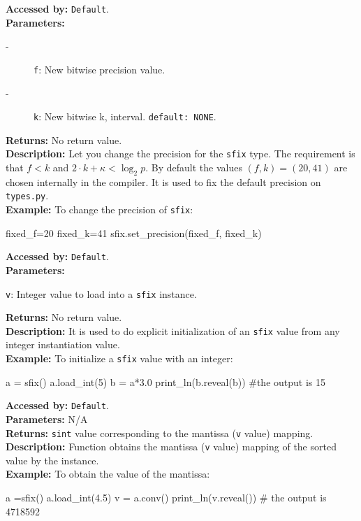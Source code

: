 			\textbf{Accessed by:} \verb|Default|.\\
    		\textbf{Parameters:}
     		\begin{description}
	     		\item[-] \verb|f|: New bitwise precision  value.
	    		\item[-] \verb|k|: New bitwise k, interval. \verb|default: NONE|.
    		\end{description}
    		\textbf{Returns:} No return value. \\
     		\textbf{Description:}
				Let you change the precision for the \verb|sfix| type. 
                                The requirement is that $f<k$ and $2 \cdot k + \kappa < \log_2 p$.
                                By default the values $(f,k)=(20,41)$ are chosen internally in the compiler.
                                It is used to fix the default precision on \verb|types.py|. \\
			\textbf{Example:}
				To change the precision of \verb|sfix|:
     			\begin{mylisting}
     			fixed_f=20
     			fixed_k=41
     			sfix.set_precision(fixed_f, fixed_k)
     			\end{mylisting}
     			
			\textbf{Accessed by:} \verb|Default|.		 \\
			\textbf{Parameters:}
			\begin{description}
				\item \verb|v|: Integer value to load into a \verb|sfix| instance.
			\end{description}
			\textbf{Returns:} No return value. \\
			\textbf{Description:}
				 It is used to do explicit initialization of an \verb|sfix| value from any integer instantiation value. \\
	     	\textbf{Example:}
    		    To initialize a \verb|sfix| value with an integer:
		     	\begin{mylisting}
				a = sfix()
				a.load_int(5)
				b = a*3.0
				print_ln(b.reveal(b))  #the output is 15   	
     			\end{mylisting}	 
			\textbf{Accessed by:} \verb|Default|.		 \\
			\textbf{Parameters:} N/A \\
			\textbf{Returns:} \verb|sint| value corresponding to the mantissa (\verb|v| value) mapping. \\
			\textbf{Description:}
				Function obtains the mantissa (\verb|v| value) mapping of the sorted value by the instance. \\
	     	\textbf{Example:}
    		    To obtain the value of the mantissa:
		     	\begin{mylisting}
				a =sfix()
				a.load_int(4.5)
				v = a.conv()
				print_ln(v.reveal())  # the output is 4718592   	
     			\end{mylisting}	 
		
